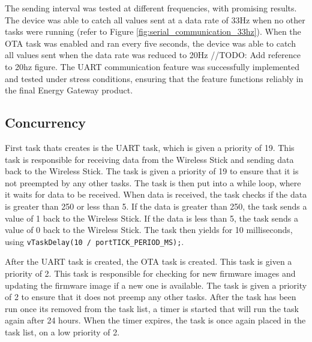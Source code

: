 The sending interval was tested at different frequencies, with promising results. The device was able to catch all values sent at a data rate of 33Hz when no other tasks were running (refer to Figure \ref{fig:serial_communication_33hz}). When the OTA task was enabled and ran every five seconds, the device was able to catch all values sent when the data rate was reduced to 20Hz //TODO: Add reference to 20hz figure. The UART communication feature was successfully implemented and tested under stress conditions, ensuring that the feature functions reliably in the final Energy Gateway product.

\subsection{Concurrency}

First task thats creates is the UART task, which is given a priority of 19. This task is responsible for receiving data from the Wireless Stick and sending data back to the Wireless Stick. The task is given a priority of 19 to ensure that it is not preempted by any other tasks. The task is then put into a while loop, where it waits for data to be received. When data is received, the task checks if the data is greater than 250 or less than 5. If the data is greater than 250, the task sends a value of 1 back to the Wireless Stick. If the data is less than 5, the task sends a value of 0 back to the Wireless Stick. The task then yields for 10 milliseconds, using \texttt{vTaskDelay(10 / portTICK\_PERIOD\_MS);}.

After the UART task is created, the OTA task is created. This task is given a priority of 2. This task is responsible for checking for new firmware images and updating the firmware image if a new one is available. The task is given a priority of 2 to ensure that it does not preemp any other tasks. After the task has been run once its removed from the task list, a timer is started that will run the task again after 24 hours. When the timer expires, the task is once again placed in the task list, on a low priority of 2.
